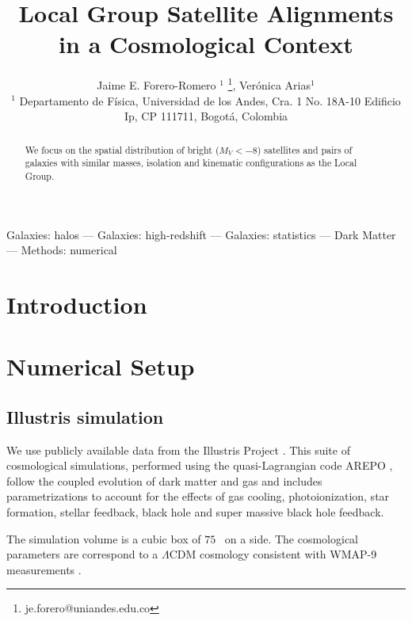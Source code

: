 \documentclass[useAMS,usenatbib,usegraphicx]{mn2e}
\newcommand{\hMpc}{{\ifmmode{h^{-1}{\rm Mpc}}\else{$h^{-1}$Mpc}\fi}}
\begin{document}
\title[LG satellite alignments]{
Local Group Satellite Alignments in a Cosmological Context}
\author[J.E. Forero-Romero \& V. Arias]
{Jaime E. Forero-Romero $^{1}$ \thanks{je.forero@uniandes.edu.co},
Ver\'onica Arias$^1$\\
$^1$ Departamento de F\'isica, Universidad de los Andes, Cra. 1
  No. 18A-10 Edificio Ip, CP 111711, Bogot\'a, Colombia \\
}

\maketitle

\begin{abstract}
We focus on the spatial distribution of bright ($M_V<-8$) satellites and
pairs of galaxies with similar masses, isolation and kinematic
configurations as the Local Group. 
\end{abstract}

\begin{keywords}Galaxies: halos --- Galaxies: high-redshift --- Galaxies: statistics
--- Dark Matter --- Methods: numerical 
\end{keywords}

\section{Introduction}

\section{Numerical Setup}
\label{sec:NumericalSetup}

\subsection{Illustris simulation}

We use publicly available data from the Illustris Project 
\citep{2014MNRAS.444.1518V}. 
This suite of cosmological simulations, performed using the quasi-Lagrangian
code AREPO \citep{2010MNRAS.401..791S}, follow the coupled evolution of dark 
matter and gas and includes parametrizations to account for the effects of
gas cooling, photoionization, star formation, stellar feedback, black
hole and super massive black hole feedback. 

The simulation volume is a cubic box of $75$ \hMpc\ on a side.
The cosmological parameters are correspond to a $\Lambda$CDM cosmology
consistent with WMAP-9 measurements \citep{2013ApJS..208...19H}.   


\cite{2012MNRAS.424...80P} 


\end{document}
